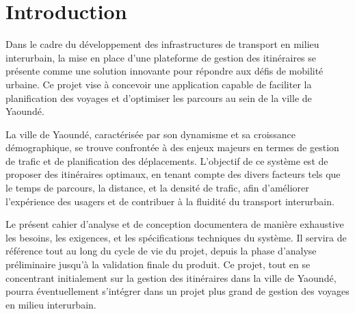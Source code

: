 \section{Introduction}

Dans le cadre du développement des infrastructures de transport en milieu interurbain, la mise en place d'une plateforme de gestion des itinéraires se présente comme une solution innovante pour répondre aux défis de mobilité urbaine. Ce projet vise à concevoir une application capable de faciliter la planification des voyages et d'optimiser les parcours au sein de la ville de Yaoundé.

La ville de Yaoundé, caractérisée par son dynamisme et sa croissance démographique, se trouve confrontée à des enjeux majeurs en termes de gestion de trafic et de planification des déplacements. L'objectif de ce système est de proposer des itinéraires optimaux, en tenant compte des divers facteurs tels que le temps de parcours, la distance, et la densité de trafic, afin d'améliorer l'expérience des usagers et de contribuer à la fluidité du transport interurbain.

Le présent cahier d'analyse et de conception documentera de manière exhaustive les besoins, les exigences, et les spécifications techniques du système. Il servira de référence tout au long du cycle de vie du projet, depuis la phase d'analyse préliminaire jusqu'à la validation finale du produit. Ce projet, tout en se concentrant initialement sur la gestion des itinéraires dans la ville de Yaoundé, pourra éventuellement s'intégrer dans un projet plus grand de gestion des voyages en milieu interurbain.


